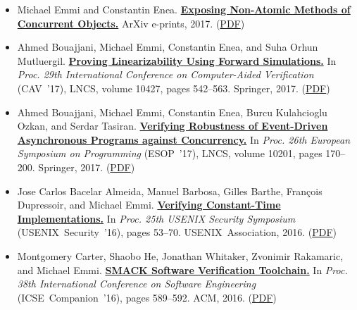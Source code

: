 \documentclass{article}
\begin{document}
\begin{itemize}[leftmargin=0cm,label={}]
    \item Michael Emmi and Constantin Enea. {\bf\href{%
    https://arxiv.org/abs/1706.09305}{%
    Exposing Non-Atomic Methods of Concurrent Objects.}} ArXiv e-prints, 2017. (\href{https://michael-emmi.github.io/https://github.com/michael-emmi/research-papers/raw/master/journals-corr-EmmiE17.pdf}{PDF})


    \item Ahmed Bouajjani, Michael Emmi, Constantin Enea, and Suha Orhun Mutluergil. {\bf\href{%
    https://doi.org/10.1007/978-3-319-63390-9}{%
    Proving Linearizability Using Forward Simulations.}} In \emph{ Proc. 29th International Conference on Computer-Aided Verification } (CAV ’17), LNCS, volume 10427, pages 542–563. Springer, 2017. (\href{https://michael-emmi.github.io/https://github.com/michael-emmi/research-papers/raw/master/conf-cav-BouajjaniEEM17.pdf}{PDF})


    \item Ahmed Bouajjani, Michael Emmi, Constantin Enea, Burcu Kulahcioglu Ozkan, and Serdar Tasiran. {\bf\href{%
    http://dx.doi.org/10.1007/978-3-662-54434-1_7}{%
    Verifying Robustness of Event-Driven Asynchronous Programs against Concurrency.}} In \emph{ Proc. 26th European Symposium on Programming } (ESOP ’17), LNCS, volume 10201, pages 170–200. Springer, 2017. (\href{https://michael-emmi.github.io/https://github.com/michael-emmi/research-papers/raw/master/conf-esop-BouajjaniEEOT17.pdf}{PDF})


    \item Jose Carlos Bacelar Almeida, Manuel Barbosa, Gilles Barthe, François Dupressoir, and Michael Emmi. {\bf\href{%
    https://www.usenix.org/conference/usenixsecurity16/technical-sessions/presentation/almeida}{%
    Verifying Constant-Time Implementations.}} In \emph{ Proc. 25th USENIX Security Symposium } (USENIX Security ’16), pages 53–70. USENIX Association, 2016. (\href{https://michael-emmi.github.io/https://github.com/michael-emmi/research-papers/raw/master/conf-uss-AlmeidaBBDE16.pdf}{PDF})


    \item Montgomery Carter, Shaobo He, Jonathan Whitaker, Zvonimir Rakamaric, and Michael Emmi. {\bf\href{%
    http://doi.acm.org/10.1145/2889160.2889163}{%
    SMACK Software Verification Toolchain.}} In \emph{ Proc. 38th International Conference on Software Engineering } (ICSE Companion ’16), pages 589–592. ACM, 2016. (\href{https://michael-emmi.github.io/https://github.com/michael-emmi/research-papers/raw/master/conf-icse-CarterHWRE16.pdf}{PDF})



\end{itemize}
\end{document}
